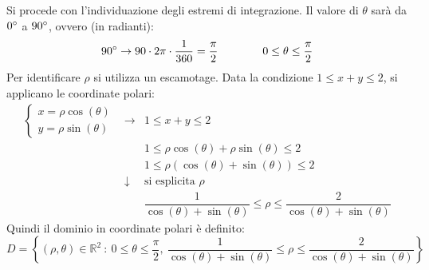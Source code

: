 \documentclass[a4paper]{article}
\begin{document}
	\noindent
	Si procede con l'individuazione degli estremi di integrazione. Il valore di $\theta$ sarà da $0\degree$ a $90\degree$, ovvero (in radianti):
	\begin{equation*}
		90\degree \rightarrow 90 \cdot 2\pi \cdot \dfrac{1}{360} = \dfrac{\pi}{2} \hspace{4em} 0 \le \theta \le \dfrac{\pi}{2}
	\end{equation*}
	Per identificare $\rho$ si utilizza un escamotage. Data la condizione $1 \le x+y \le 2$, si applicano le coordinate polari:
	\begin{equation*}
		\begin{array}{rcl}
			\begin{cases}
				x = \rho \cos\left(\theta\right) \\
				y = \rho \sin\left(\theta\right)
			\end{cases}
			&\longrightarrow&
			1 \le x+y \le 2 \\ [1em]
			&&
			1 \le \rho \cos\left(\theta\right) + \rho \sin\left(\theta\right) \le 2 \\ [.8em]
			&&
			1 \le \rho \left(\cos\left(\theta\right) + \sin\left(\theta\right)\right) \le 2 \\ [.8em]
			&\downarrow& \text{si esplicita }\rho \\ [.8em]
			&&
			\dfrac{1}{\cos\left(\theta\right) + \sin\left(\theta\right)} \le \rho \le \dfrac{2}{\cos\left(\theta\right) + \sin\left(\theta\right)}
		\end{array}
	\end{equation*}
	Quindi il dominio in coordinate polari è definito:
	\begin{equation*}
		D = \left\{\left(\rho, \theta\right) \in \mathbb{R}^{2} \: : \: 0 \le \theta \le \dfrac{\pi}{2}, \: \dfrac{1}{\cos\left(\theta\right) + \sin\left(\theta\right)} \le \rho \le \dfrac{2}{\cos\left(\theta\right) + \sin\left(\theta\right)}\right\}
	\end{equation*}\newpage
\end{document}
